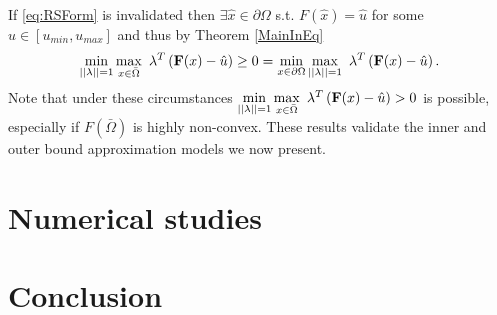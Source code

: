 \documentclass[11pt]{article}
\theoremstyle{plain}
\theoremstyle{definition}
\theoremstyle{remark}
\begin{document}
\ \\
If \eqref{eq:RSForm} is invalidated then $\exists \hat{x}\in\partial\Omega$ s.t. $F(\hat{x})=\hat{u}$ for some $\hat{u}\in[u_{min},u_{max}]$ and thus by Theorem \ref{MainInEq} 
$$\min\limits_{||\bold{\lambda}||=1}\max\limits_{x\in \bar{\Omega}}\ \bold{\lambda}^T\left(\bold{F}(x)-\hat{u}\right)\geq 0 = \min\limits_{x\in \partial \Omega}\max\limits_{||\bold{\lambda}||=1}\ \bold{\lambda}^T\left(\bold{F}(x)-\hat{u}\right).$$
Note that under these circumstances $\min\limits_{||\bold{\lambda}||=1}\max\limits_{x\in \bar{\Omega}}\ \bold{\lambda}^T\left(\bold{F}(x)-\hat{u}\right)> 0$ is possible, especially if $F(\bar{\Omega})$ is highly non-convex. These results validate the inner and outer bound approximation models we now present.





 



\section{Numerical studies}


\section{Conclusion}
\end{document}
